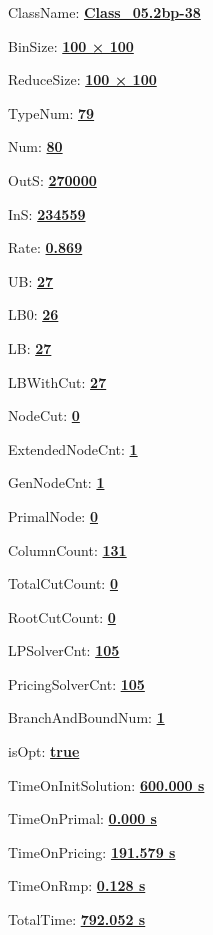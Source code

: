 \documentclass[11pt]{article}
\begin{document}
\pagestyle{empty}


ClassName: \underline{\textbf{Class_05.2bp-38}}
\par
BinSize: \underline{\textbf{100 × 100}}
\par
ReduceSize: \underline{\textbf{100 × 100}}
\par
TypeNum: \underline{\textbf{79}}
\par
Num: \underline{\textbf{80}}
\par
OutS: \underline{\textbf{270000}}
\par
InS: \underline{\textbf{234559}}
\par
Rate: \underline{\textbf{0.869}}
\par
UB: \underline{\textbf{27}}
\par
LB0: \underline{\textbf{26}}
\par
LB: \underline{\textbf{27}}
\par
LBWithCut: \underline{\textbf{27}}
\par
NodeCut: \underline{\textbf{0}}
\par
ExtendedNodeCnt: \underline{\textbf{1}}
\par
GenNodeCnt: \underline{\textbf{1}}
\par
PrimalNode: \underline{\textbf{0}}
\par
ColumnCount: \underline{\textbf{131}}
\par
TotalCutCount: \underline{\textbf{0}}
\par
RootCutCount: \underline{\textbf{0}}
\par
LPSolverCnt: \underline{\textbf{105}}
\par
PricingSolverCnt: \underline{\textbf{105}}
\par
BranchAndBoundNum: \underline{\textbf{1}}
\par
isOpt: \underline{\textbf{true}}
\par
TimeOnInitSolution: \underline{\textbf{600.000 s}}
\par
TimeOnPrimal: \underline{\textbf{0.000 s}}
\par
TimeOnPricing: \underline{\textbf{191.579 s}}
\par
TimeOnRmp: \underline{\textbf{0.128 s}}
\par
TotalTime: \underline{\textbf{792.052 s}}
\par
\newpage


\end{document}
